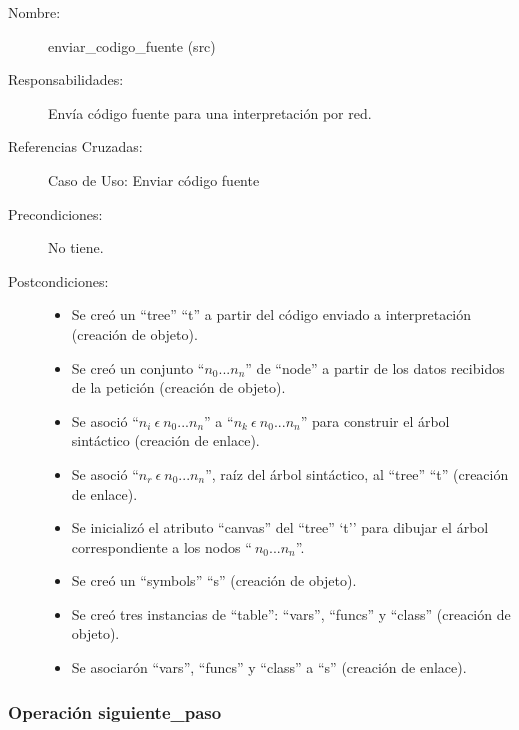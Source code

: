 	\begin{description}
		\item [Nombre:] enviar\_codigo\_fuente (src)
		\item [Responsabilidades:] Envía código fuente para una interpretación por red.
		\item [Referencias Cruzadas: ] Caso de Uso: Enviar código fuente
      \item [Precondiciones:] No tiene.
      \item [Postcondiciones:] \hfill
      \begin {itemize}
         \item Se creó un ``tree'' ``t'' a partir del código enviado a interpretación (creación de objeto).
         \item Se creó un conjunto ``$n_0...n_n$'' de ``node'' a partir de los datos recibidos de la petición (creación de objeto).
         \item Se asoció ``$n_i\ \epsilon\ n_0...n_n$'' a ``$n_k\ \epsilon\ n_0...n_n$'' para construir el árbol sintáctico (creación de enlace).
         \item Se asoció  ``$n_r\ \epsilon\ n_0...n_n$'', raíz del árbol sintáctico, al ``tree'' ``t'' (creación de enlace).
         \item Se inicializó el atributo ``canvas'' del ``tree'' `t'' para dibujar el árbol correspondiente a los nodos ``$\ n_0...n_n$''.
         \item Se creó un ``symbols'' ``s'' (creación de objeto).
         \item Se creó tres instancias de ``table'': ``vars'', ``funcs'' y ``class'' (creación de objeto).
         \item Se asociarón ``vars'', ``funcs'' y ``class'' a ``s'' (creación de enlace).
      \end{itemize}
	\end{description}


\subsubsection{Operación siguiente\_paso}

